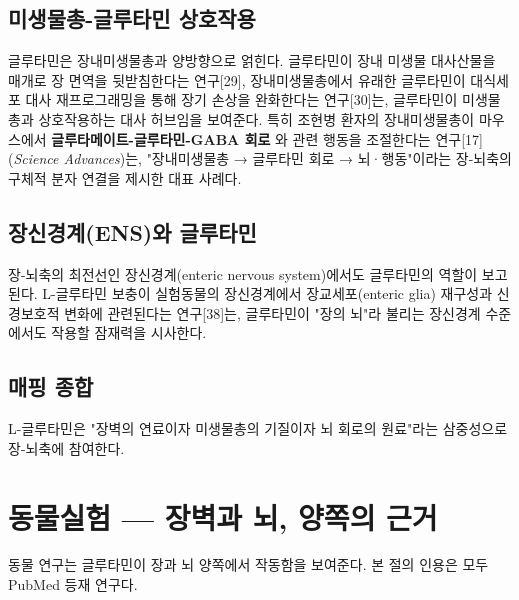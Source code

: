\documentclass[11pt,oneside]{book}
\begin{document}
\subsection{미생물총-글루타민 상호작용}
글루타민은 장내미생물총과 양방향으로 얽힌다. 글루타민이 장내 미생물 대사산물을 매개로 장 면역을 뒷받침한다는 연구[29], 장내미생물총에서 유래한 글루타민이 대식세포 대사 재프로그래밍을 통해 장기 손상을 완화한다는 연구[30]는, 글루타민이 미생물총과 상호작용하는 대사 허브임을 보여준다. 특히 조현병 환자의 장내미생물총이 마우스에서 \textbf{글루타메이트-글루타민-GABA 회로} 와 관련 행동을 조절한다는 연구[17](\textit{Science Advances})는, "장내미생물총 → 글루타민 회로 → 뇌·행동"이라는 장-뇌축의 구체적 분자 연결을 제시한 대표 사례다.

\subsection{장신경계(ENS)와 글루타민}
장-뇌축의 최전선인 장신경계(enteric nervous system)에서도 글루타민의 역할이 보고된다. L-글루타민 보충이 실험동물의 장신경계에서 장교세포(enteric glia) 재구성과 신경보호적 변화에 관련된다는 연구[38]는, 글루타민이 "장의 뇌"라 불리는 장신경계 수준에서도 작용할 잠재력을 시사한다.

\subsection{매핑 종합}
\vspace{2pt}\vspace{3pt}

L-글루타민은 "장벽의 연료이자 미생물총의 기질이자 뇌 회로의 원료"라는 삼중성으로 장-뇌축에 참여한다.

\section{동물실험 — 장벽과 뇌, 양쪽의 근거}
동물 연구는 글루타민이 장과 뇌 양쪽에서 작동함을 보여준다. 본 절의 인용은 모두 PubMed 등재 연구다.
\end{document}
